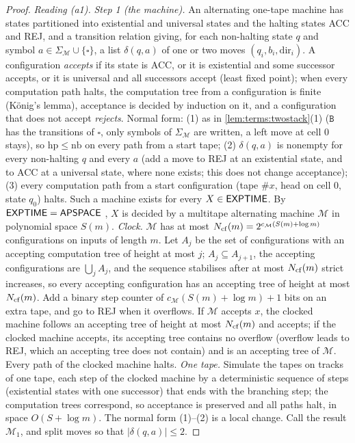 \begin{proof}
\emph{Reading (a1).} \emph{Step 1 (the machine).} An alternating one-tape machine has states partitioned into existential and universal states and the halting states ACC and REJ, and a transition relation giving, for each non-halting state $q$ and symbol $a\in\Sigma_{\mathcal M}\cup\{\square\}$, a list $\delta(q,a)$ of one or two moves $(q_i,b_i,\mathrm{dir}_i)$. A configuration \emph{accepts} if its state is ACC, or it is existential and some successor accepts, or it is universal and all successors accept (least fixed point); when every computation path halts, the computation tree from a configuration is finite (König's lemma), acceptance is decided by induction on it, and a configuration that does not accept \emph{rejects}. Normal form: (1) as in \cref{lem:terms:twostack}(1) ($\mathtt B$ has the transitions of $\square$, only symbols of $\Sigma_{\mathcal M}$ are written, a left move at cell $0$ stays), so $\mathrm{hp}\le\mathrm{nb}$ on every path from a start tape; (2) $\delta(q,a)$ is nonempty for every non-halting $q$ and every $a$ (add a move to REJ at an existential state, and to ACC at a universal state, where none exists; this does not change acceptance); (3) every computation path from a start configuration (tape $\#x$, head on cell $0$, state $q_0$) halts. Such a machine exists for every $X\in\mathsf{EXPTIME}$. By $\mathsf{EXPTIME}=\mathsf{APSPACE}$ \citep{chandra1981alternation}, $X$ is decided by a multitape alternating machine $\mathcal M$ in polynomial space $S(m)$. \emph{Clock.} $\mathcal M$ has at most $N_{\rm cf}(m)=2^{c_{\mathcal M}(S(m)+\log m)}$ configurations on inputs of length $m$. Let $A_j$ be the set of configurations with an accepting computation tree of height at most $j$; $A_j\subseteq A_{j+1}$, the accepting configurations are $\bigcup_jA_j$, and the sequence stabilises after at most $N_{\rm cf}(m)$ strict increases, so every accepting configuration has an accepting tree of height at most $N_{\rm cf}(m)$. Add a binary step counter of $c_{\mathcal M}(S(m)+\log m)+1$ bits on an extra tape, and go to REJ when it overflows. If $\mathcal M$ accepts $x$, the clocked machine follows an accepting tree of height at most $N_{\rm cf}(m)$ and accepts; if the clocked machine accepts, its accepting tree contains no overflow (overflow leads to REJ, which an accepting tree does not contain) and is an accepting tree of $\mathcal M$. Every path of the clocked machine halts. \emph{One tape.} Simulate the tapes on tracks of one tape, each step of the clocked machine by a deterministic sequence of steps (existential states with one successor) that ends with the branching step; the computation trees correspond, so acceptance is preserved and all paths halt, in space $O(S+\log m)$. The normal form (1)--(2) is a local change. Call the result $\mathcal M_1$, and split moves so that $\lvert\delta(q,a)\rvert\le2$.


\end{proof}
